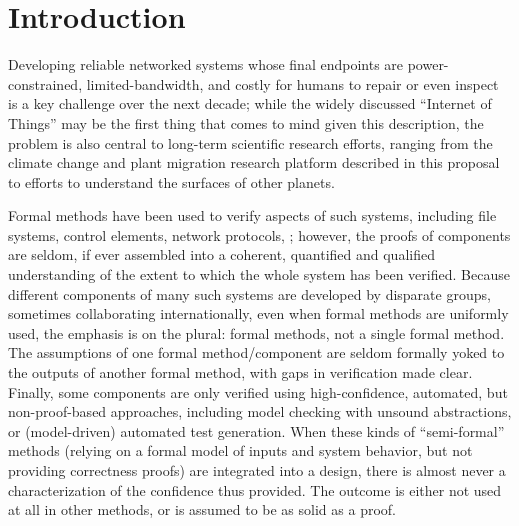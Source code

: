 
\section{Introduction}

Developing reliable networked systems whose final endpoints are
power-constrained, limited-bandwidth, and costly for humans to
repair or even inspect is a key challenge over the next decade; while the
widely discussed ``Internet of Things'' may be the first thing that
comes to mind given this description, the problem is also central to long-term
scientific research efforts, ranging from the climate change and
plant migration research platform described in this proposal to
efforts to understand the surfaces of other planets.

Formal methods have been used to verify aspects of such systems,
including file systems, control elements, network protocols,
; however, the proofs
of components are seldom, if ever assembled into a coherent,
quantified and qualified understanding of the extent to which the
whole system has been verified.  Because different components of many
such systems are developed by disparate groups, sometimes
collaborating internationally, even when formal methods are uniformly
used, the emphasis is on the plural:  formal methods, not a single
formal method.  The assumptions of one formal method/component are
seldom formally yoked to the outputs of another formal method, with
gaps in verification made clear.   Finally, some components are only
verified using high-confidence, automated, but non-proof-based
approaches, including model checking with unsound abstractions, or
(model-driven) automated test generation.  When these kinds of
``semi-formal'' methods (relying on a formal model of inputs and
system behavior, but not providing correctness proofs) are integrated
into a design, there is almost never a characterization of the
confidence thus provided.  The outcome is either not used at all in
other methods, or is assumed to be as solid as a proof.

